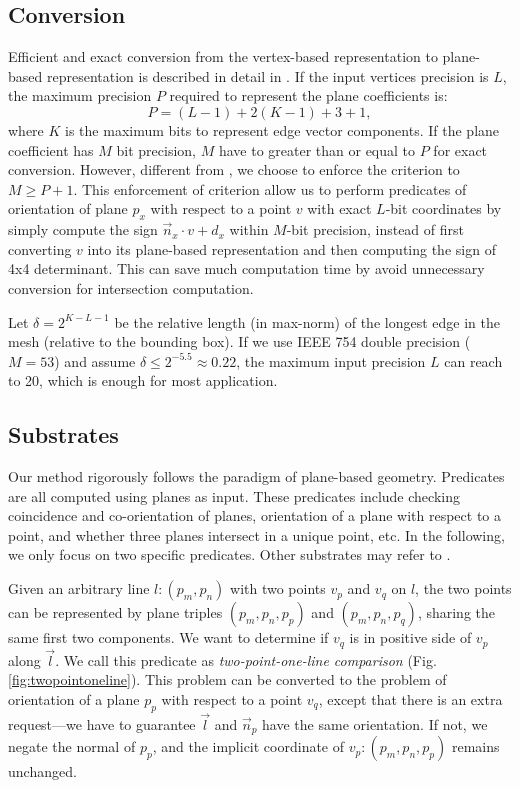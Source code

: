 \documentclass[10pt,journal,compsoc]{IEEEtran}
\begin{document}
\subsection{Conversion}

\label{sec:convert}

Efficient and exact conversion from the vertex-based representation to plane-based representation is described in detail in \cite{campen2010exact}. If the input vertices precision is $L$, the maximum precision $P$ required to represent the plane coefficients is:
\begin{equation}
\label{eq:precision}
P = (L-1)+2(K-1)+3+1,
\end{equation}
where $K$  is the maximum bits to represent edge vector components. If the plane coefficient has $M$ bit precision, $M$ have to greater than or equal to $P$ for exact conversion. However, different from \cite{campen2010exact}, we choose to enforce the criterion to $M \ge P+1$. This enforcement of criterion allow us to perform predicates of orientation of plane $p_x$ with respect to a point $v$ with exact $L$-bit coordinates by simply compute the sign ${\vec{n}_x}\cdot{v} + d_x$ within $M$-bit precision, instead of first converting $v$ into its plane-based representation and then computing the sign of 4x4 determinant. This can save much computation time by avoid unnecessary conversion for intersection computation.


Let $\delta = 2^{K-L-1}$ be the relative length (in max-norm) of the longest edge in the mesh (relative to the bounding box). If we use IEEE 754 double precision ($M=53$) and assume $\delta \le 2^{-5.5} \approx 0.22$, the maximum input precision $L$ can reach to 20, which is enough for most application.


\subsection{Substrates}
\label{sec:substrates}
Our method rigorously follows the paradigm of plane-based geometry. Predicates are all computed using planes as input. These predicates include checking coincidence and co-orientation of planes, orientation of a plane with respect to a point, and whether three planes intersect in a unique point, etc. In the following, we only focus on two specific predicates. Other substrates may refer to \cite{bernstein2009fast}.


Given an arbitrary line $l\colon(p_m, p_n)$ with two points $v_p$ and $v_q$ on $l$, the two points can be represented by plane triples $(p_m, p_n, p_p)$ and $(p_m, p_n, p_q)$, sharing the same first two components. We want to determine if $v_q$ is in positive side of $v_p$ along $\vec{l}$. We call this predicate as \emph{two-point-one-line comparison} (Fig. \ref{fig:twopointoneline}). This problem can be converted to the problem of orientation of a plane $p_p$ with respect to a point $v_q$, except that there is an extra request---we have to guarantee $\vec{l}$ and $\vec{n}_p$ have the same orientation. If not, we negate the normal of $p_p$, and the implicit coordinate of  $v_p\colon(p_m, p_n, p_p)$ remains unchanged.
\end{document}
